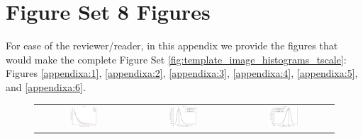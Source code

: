 \documentclass[preprintm,linenumbers]{aastex631}
\begin{document}
		\section{Figure Set 8 Figures}
		
		For ease of the reviewer/reader, in this appendix we provide the figures that would make the complete Figure Set \ref{fig:template_image_histograms_tscale}: Figures \ref{appendixa:1}, \ref{appendixa:2}, \ref{appendixa:3}, \ref{appendixa:4}, \ref{appendixa:5}, and \ref{appendixa:6}. 
  
		
		\begin{figure}[h]
			\centering
			\begin{tabular}{c c c}
				
				\includegraphics[width=0.3\textwidth]{results/histograms_templates_tscale/hist_first_year_one_snap_v4_0_10yrs_db_noDD_noTwi_doALLTemplateMetrics_reduceNTemplate_u_noDD_noTwi.pdf} &
				\includegraphics[width=0.3\textwidth]{results/histograms_templates_tscale/hist_first_year_one_snap_v4_0_10yrs_db_noDD_noTwi_doALLTemplateMetrics_reduceSeeingTemplate_u_noDD_noTwi.pdf} &
				\includegraphics[width=0.3\textwidth]{results/histograms_templates_tscale/hist_first_year_one_snap_v4_0_10yrs_db_noDD_noTwi_doALLTemplateMetrics_reduceDepthTemplate_u_noDD_noTwi.pdf} \\
				

\end{tabular}
\end{figure}
\end{document}
